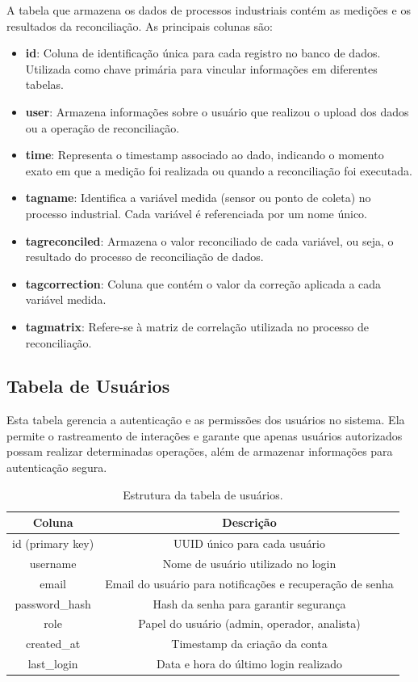 A tabela que armazena os dados de processos industriais contém as medições e os resultados da reconciliação. As principais colunas são:

\begin{itemize}
    \item \textbf{id}: Coluna de identificação única para cada registro no banco de dados. Utilizada como chave primária para vincular informações em diferentes tabelas.
    \item \textbf{user}: Armazena informações sobre o usuário que realizou o upload dos dados ou a operação de reconciliação.
    \item \textbf{time}: Representa o timestamp associado ao dado, indicando o momento exato em que a medição foi realizada ou quando a reconciliação foi executada.
    \item \textbf{tagname}: Identifica a variável medida (sensor ou ponto de coleta) no processo industrial. Cada variável é referenciada por um nome único.
    \item \textbf{tagreconciled}: Armazena o valor reconciliado de cada variável, ou seja, o resultado do processo de reconciliação de dados.
    \item \textbf{tagcorrection}: Coluna que contém o valor da correção aplicada a cada variável medida.
    \item \textbf{tagmatrix}: Refere-se à matriz de correlação utilizada no processo de reconciliação.
\end{itemize}

\subsection{Tabela de Usuários}

Esta tabela gerencia a autenticação e as permissões dos usuários no sistema. Ela permite o rastreamento de interações e garante que apenas usuários autorizados possam realizar determinadas operações, além de armazenar informações para autenticação segura.

\begin{table}[htbp]
    \centering
    \caption{Estrutura da tabela de usuários.}
    \label{Tab:Users}
    \begin{tabular}{|c|c|}
        \hline
        \textbf{Coluna} & \textbf{Descrição} \\ \hline
        id (primary key) & UUID único para cada usuário \\ \hline
        username & Nome de usuário utilizado no login \\ \hline
        email & Email do usuário para notificações e recuperação de senha \\ \hline
        password\_hash & Hash da senha para garantir segurança \\ \hline
        role & Papel do usuário (admin, operador, analista) \\ \hline
        created\_at & Timestamp da criação da conta \\ \hline
        last\_login & Data e hora do último login realizado \\ \hline
    \end{tabular}
\end{table}

